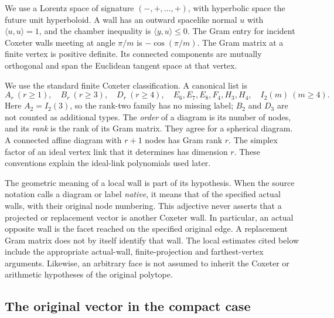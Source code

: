 \documentclass[11pt]{article}
\theoremstyle{definition}
\theoremstyle{remark}
\numberwithin{equation}{section}
\newcommand{\ip}[2]{\langle #1,#2\rangle}
\begin{document}
We use a Lorentz space of signature $(-,+,\ldots,+)$, with hyperbolic
space the future unit hyperboloid. A wall has an outward spacelike
normal $u$ with $\ip{u}{u}=1$, and the chamber inequality is
$\ip{y}{u}\le0$. The Gram entry for incident Coxeter walls meeting at
angle $\pi/m$ is $-\cos(\pi/m)$. The Gram matrix at a finite vertex is
positive definite. Its connected components are mutually orthogonal
and span the Euclidean tangent space at that vertex.

We use the standard finite Coxeter classification. A canonical list
is
\[
 A_r\ (r\ge1),\quad B_r\ (r\ge3),\quad D_r\ (r\ge4),\quad
 E_6,E_7,E_8,F_4,H_3,H_4,\quad I_2(m)\ (m\ge4).
\]
Here $A_2=I_2(3)$, so the rank-two family has no missing label;
$B_2$ and $D_3$ are not counted as additional types. The \emph{order}
of a diagram is its number of nodes, and its \emph{rank} is the rank
of its Gram matrix. They agree for a spherical diagram. A connected
affine diagram with $r+1$ nodes has Gram rank $r$. The simplex factor
of an ideal vertex link that it determines has dimension $r$.
These conventions explain the ideal-link polynomials used later.

The geometric meaning of a local wall is part of its hypothesis.
When the source notation calls a diagram or label \emph{native}, it
means that of the specified actual walls, with their original node
numbering. This adjective never asserts that a projected or
replacement vector is another Coxeter wall.
In particular, an actual opposite wall is the facet reached on the
specified original edge. A replacement Gram matrix does not by itself
identify that wall. The local estimates cited below include the
appropriate actual-wall, finite-projection and farthest-vertex
arguments. Likewise, an arbitrary face is not assumed to inherit
the Coxeter or arithmetic hypotheses of the original polytope.

\subsection{The original vector in the compact case}
\end{document}
